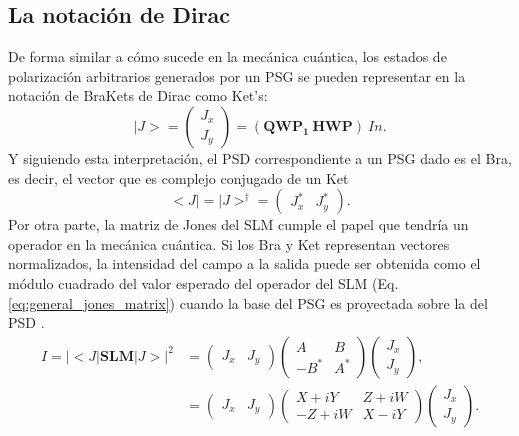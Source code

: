 \subsection{La notación de Dirac}
De forma similar a cómo sucede en la mecánica cuántica, los estados de
polarización arbitrarios generados por un PSG se pueden representar en
la notación de BraKets de Dirac como Ket's:
\begin{equation}
|J> = \begin{pmatrix} J_x \\ J_y\end{pmatrix} = \left( \mathbf{QWP_1}\
\mathbf{HWP}\right)\ In.
\end{equation}
Y siguiendo esta interpretación, el PSD correspondiente a un PSG dado
es el Bra, es decir, el vector que es complejo conjugado de un Ket
\begin{equation}
<J|= |J>^{\dagger} = \begin{pmatrix} J_x^* &  J_y^*\end{pmatrix}. 
\end{equation}
Por otra parte, la matriz de Jones del SLM cumple el papel que tendría un
operador en la mecánica cuántica. Si los Bra y Ket representan vectores normalizados, la
intensidad del campo a la salida puede ser obtenida como el módulo
cuadrado del valor
esperado del operador del SLM  (Eq. \ref{eq:general_jones_matrix})
cuando la base del PSG es proyectada sobre la del PSD .
\begin{align}
\label{eq:valor_esperado}
I = |<J|\mathbf{SLM} |J>|^2 &= 
\begin{pmatrix}
J_x & J_y
\end{pmatrix}
\begin{pmatrix}
A & B\\
 -B^* & A^* 
\end{pmatrix}
\begin{pmatrix}
J_x \\ J_y
\end{pmatrix}
,\nonumber\\
&= 
\begin{pmatrix}
J_x & J_y
\end{pmatrix}
\begin{pmatrix}
X+iY & Z+iW\\
 -Z+iW & X-iY 
\end{pmatrix}
\begin{pmatrix}
J_x \\ J_y
\end{pmatrix}
.
\end{align}

